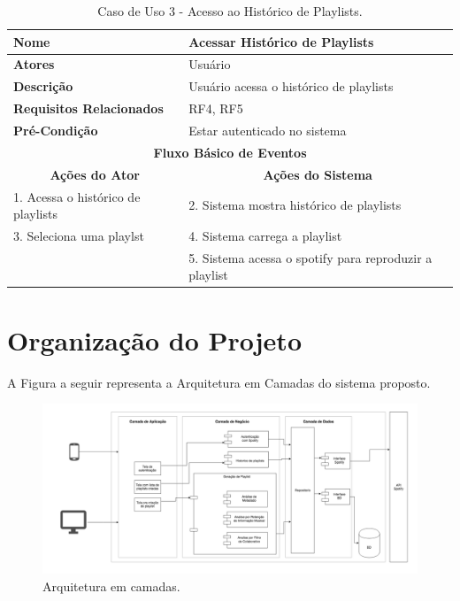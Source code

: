 \documentclass[
	12pt,				%
    oneside,			%
	a4paper,			%
	english,			%
	french,				%
	spanish,			%
	brazil,				%
	]{abntex2}
\begin{document}
\begin{table}[h]
\centering
\label{tableUC3}
\begin{tabular}{|l|l|}
\hline
\textbf{Nome}                    & Acessar Histórico de Playlists   \\ \hline
\textbf{Atores}                  & Usuário                   \\ \hline
\textbf{Descrição}               & Usuário acessa o histórico de playlists \\ \hline
\textbf{Requisitos Relacionados} & RF4, RF5                  \\ \hline
\textbf{Pré-Condição}            & Estar autenticado no sistema                   \\ \hline
\multicolumn{2}{|c|}{\textbf{Fluxo Básico de Eventos}}       \\ \hline
\multicolumn{1}{|c|}{\textbf{Ações do Ator}}&\multicolumn{1}{|c|}{\textbf{Ações do Sistema}} \\ \hline
1. Acessa o histórico de playlists & 2. Sistema mostra histórico de playlists  \\ \hline
3. Seleciona uma playlst & 4. Sistema carrega a playlist \\ \hline
& 5. Sistema acessa o spotify para reproduzir a playlist \\ \hline
\end{tabular}
\caption{Caso de Uso 3 - Acesso ao Histórico de Playlists.}
\end{table}



\section{Organização do Projeto}
A Figura a seguir representa a Arquitetura em Camadas do sistema proposto.

\begin{figure}[!htb]
    \centering
  \includegraphics[width=1.0\textwidth]{visao_geral.png}
  \caption{Arquitetura em camadas.}
  \label{fig:arquitetura_em_camadas}
\end{figure}
\end{document}
